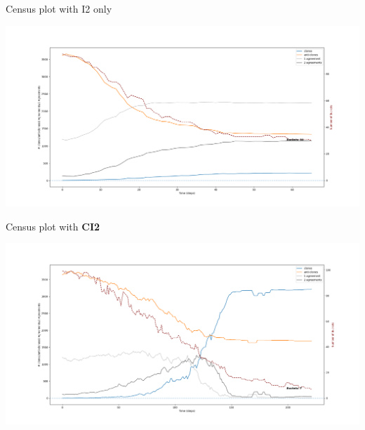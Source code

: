 \documentclass[12pt]{beamer}
\begin{document}
\begin{frame}[c]{Census plot with I2 only} %

\vspace{-.3in}
\begin{center}
\hspace{-.6in} \includegraphics[width=1.11\textwidth]{census3issuesI2.png}
\end{center}

\end{frame}

\begin{frame}[c]{Census plot with \textbf{CI2}} %

\vspace{-.3in}
\begin{center}
\hspace{-.6in} \includegraphics[width=1.11\textwidth]{census3issuesCI2.png}
\end{center}

\end{frame}
\end{document}
